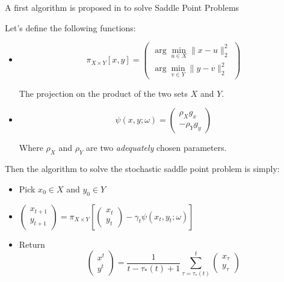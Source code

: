 \documentclass[12pt,reqno]{amsart}
\numberwithin{equation}{section}
\begin{document}
A first algorithm is proposed in \cite{NemirovskiRubinstein} to solve Saddle Point Problems


Let's define the following functions:
\begin{itemize}
\item $$\pi_{X \times Y}[x,y] = \begin{pmatrix} \arg\min_{u \in X}\lVert x - u \rVert_{2}^{2} \\ \arg\min_{v \in Y}\lVert y - v \rVert_{2}^{2} \end{pmatrix}$$

The projection on the product of the two sets $X$ and $Y$.

\item $$\psi(x,y;\omega) = \begin{pmatrix} \rho_{X} g_{x} \\ -\rho_{Y} g_{y}  \end{pmatrix}$$

Where $\rho_{X}$ and $\rho_{Y}$ are two \emph{adequately} chosen parameters.

\end{itemize}


\vspace{0.5cm}

Then the algorithm to solve the stochastic saddle point problem is simply:

\vspace{0.5cm}




\begin{itemize}
\item Pick $x_{0} \in X$ and $y_{0} \in Y$
\item $\begin{pmatrix} x_{t+1} \\ y_{t+1} \end{pmatrix} = \pi_{X \times Y}[\begin{pmatrix} x_{t} \\ y_{t} \end{pmatrix} - \gamma_{t}\psi(x_{t},y_{t};\omega)]$
\item Return 
$$
\begin{pmatrix} x^{t} \\ y^{t} \end{pmatrix} = \dfrac{1}{t - \tau_{*}(t) + 1}\sum_{\tau = \tau_{*}(t)}^{t}\begin{pmatrix} x_{\tau} \\ y_{\tau} \end{pmatrix}
$$
\end{itemize}
\end{document}
